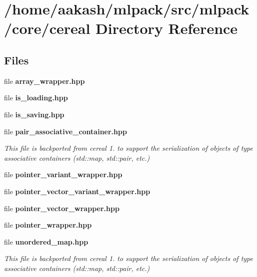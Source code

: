 \section{/home/aakash/mlpack/src/mlpack/core/cereal Directory Reference}
\label{dir_0943fc26809aa3eb53d8919f6d72c8ee}
\subsection*{Files}
\begin{DoxyCompactItemize}
\item 
file \textbf{ array\+\_\+wrapper.\+hpp}
\item 
file \textbf{ is\+\_\+loading.\+hpp}
\item 
file \textbf{ is\+\_\+saving.\+hpp}
\item 
file \textbf{ pair\+\_\+associative\+\_\+container.\+hpp}
\begin{DoxyCompactList}\small\item\em This file is backported from cereal 1. to support the serialization of objects of type associative containers (std\+::map, std\+::pair, etc.) \end{DoxyCompactList}\item 
file \textbf{ pointer\+\_\+variant\+\_\+wrapper.\+hpp}
\item 
file \textbf{ pointer\+\_\+vector\+\_\+variant\+\_\+wrapper.\+hpp}
\item 
file \textbf{ pointer\+\_\+vector\+\_\+wrapper.\+hpp}
\item 
file \textbf{ pointer\+\_\+wrapper.\+hpp}
\item 
file \textbf{ unordered\+\_\+map.\+hpp}
\begin{DoxyCompactList}\small\item\em This file is backported from cereal 1. to support the serialization of objects of type associative containers (std\+::map, std\+::pair, etc.) \end{DoxyCompactList}\end{DoxyCompactItemize}
